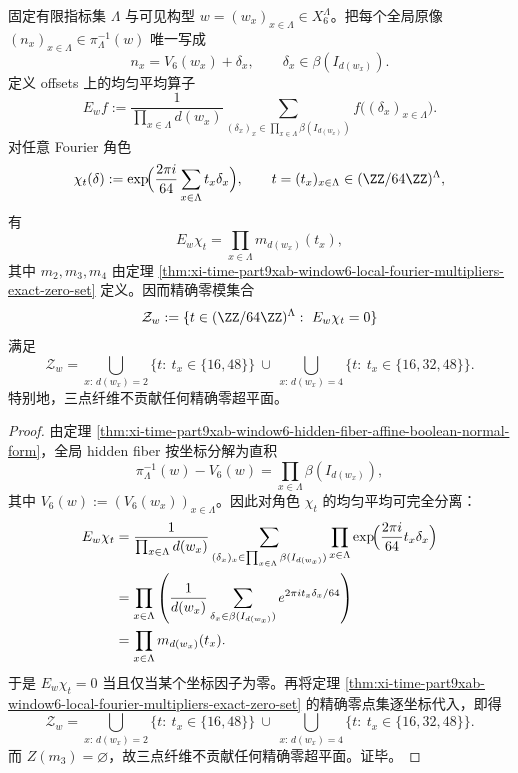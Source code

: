 \begin{theorem}\label{thm:xi-time-part9xab-window6-hidden-averaging-alias-hyperplanes}
固定有限指标集 \(\Lambda\) 与可见构型 \(w=(w_x)_{x\in\Lambda}\in X_6^\Lambda\)。把每个全局原像 \((n_x)_{x\in\Lambda}\in \pi_\Lambda^{-1}(w)\) 唯一写成
\[
n_x=V_6(w_x)+\delta_x,
\qquad
\delta_x\in \beta(I_{d(w_x)}).
\]
定义 offsets 上的均匀平均算子
\[
E_w f
:=
\frac{1}{\prod_{x\in\Lambda} d(w_x)}
\sum_{(\delta_x)_x\in \prod_{x\in\Lambda}\beta(I_{d(w_x)})}
f\bigl((\delta_x)_{x\in\Lambda}\bigr).
\]
对任意 Fourier 角色
\[
\chi_t(\delta):=
\exp\!\Bigl(\frac{2\pi i}{64}\sum_{x\in\Lambda} t_x\delta_x\Bigr),
\qquad
t=(t_x)_{x\in\Lambda}\in (\ZZ/64\ZZ)^\Lambda,
\]
有
\[
E_w\chi_t=\prod_{x\in\Lambda} m_{d(w_x)}(t_x),
\]
其中 \(m_2,m_3,m_4\) 由定理 \ref{thm:xi-time-part9xab-window6-local-fourier-multipliers-exact-zero-set} 定义。因而精确零模集合
\[
\mathcal Z_w:=\{t\in (\ZZ/64\ZZ)^\Lambda:\ E_w\chi_t=0\}
\]
满足
\[
\mathcal Z_w
=
\bigcup_{x:\,d(w_x)=2}\{t:\ t_x\in\{16,48\}\}
\ \cup\
\bigcup_{x:\,d(w_x)=4}\{t:\ t_x\in\{16,32,48\}\}.
\]
特别地，三点纤维不贡献任何精确零超平面。
\end{theorem}
\begin{proof}
由定理 \ref{thm:xi-time-part9xab-window6-hidden-fiber-affine-boolean-normal-form}，全局 hidden fiber 按坐标分解为直积
\[
\pi_\Lambda^{-1}(w)-V_6(w)
=
\prod_{x\in\Lambda}\beta(I_{d(w_x)}),
\]
其中 \(V_6(w):=(V_6(w_x))_{x\in\Lambda}\)。因此对角色 \(\chi_t\) 的均匀平均可完全分离：
\[
\begin{aligned}
E_w\chi_t
&=
\frac{1}{\prod_{x\in\Lambda} d(w_x)}
\sum_{(\delta_x)_x\in \prod_{x\in\Lambda}\beta(I_{d(w_x)})}
\prod_{x\in\Lambda}
\exp\!\Bigl(\frac{2\pi i}{64}t_x\delta_x\Bigr)\\
&=
\prod_{x\in\Lambda}
\left(
\frac1{d(w_x)}
\sum_{\delta_x\in \beta(I_{d(w_x)})}
e^{2\pi i t_x\delta_x/64}
\right)\\
&=
\prod_{x\in\Lambda} m_{d(w_x)}(t_x).
\end{aligned}
\]
于是 \(E_w\chi_t=0\) 当且仅当某个坐标因子为零。再将定理 \ref{thm:xi-time-part9xab-window6-local-fourier-multipliers-exact-zero-set} 的精确零点集逐坐标代入，即得
\[
\mathcal Z_w
=
\bigcup_{x:\,d(w_x)=2}\{t:\ t_x\in\{16,48\}\}
\ \cup\
\bigcup_{x:\,d(w_x)=4}\{t:\ t_x\in\{16,32,48\}\}.
\]
而 \(Z(m_3)=\varnothing\)，故三点纤维不贡献任何精确零超平面。证毕。
\end{proof}


